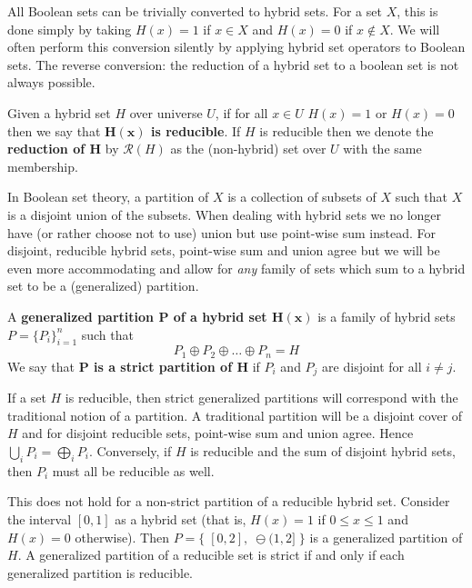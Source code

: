 All Boolean sets can be trivially converted to hybrid sets.
For a set $X$, this is done simply by taking $H(x)=1$ if $x \in X$ and $H(x)=0$ if $x \notin X$.
We will often perform this conversion silently by applying hybrid set operators to Boolean sets.
The reverse conversion: the reduction of a hybrid set to a boolean set is not always possible.


\begin{definition}
	Given a hybrid set $H$ over universe $U$, 
	if for all $x \in U$ $H(x)=1$ or $H(x)=0$ then we say that \textbf{$\boldsymbol{H(x)}$ is reducible}.
	If $H$ is reducible then we denote the \textbf{reduction of $\boldsymbol{H}$} by $\mathcal{R}(H)$ 
	as the (non-hybrid) set over $U$ with the same membership.  
\end{definition}


In Boolean set theory, a partition of $X$ is a collection of subsets of $X$ such that $X$ is a disjoint union of the subsets.
When dealing with hybrid sets we no longer have (or rather choose not to use) union but use point-wise sum instead.
For disjoint, reducible hybrid sets, point-wise sum and union agree but we will be even more accommodating 
and allow for \emph{any} family of sets which sum to a hybrid set to be a (generalized) partition.


\begin{definition}
	A \textbf{generalized partition $\boldsymbol{P}$ of a hybrid set $\boldsymbol{H(x)}$} is a family of hybrid sets
	$P=\{P_i \}_{i=1}^n$ such that
	\begin{equation}
		P_1 \oplus P_2 \oplus \ldots \oplus P_n = H
	\end{equation}
	We say that \textbf{$\boldsymbol{P}$ is a strict partition of $\boldsymbol{H}$} if 
	$P_i$ and $P_j$ are disjoint for all $i \neq j$.
\end{definition}


If a set $H$ is reducible, then strict generalized partitions will correspond with the traditional notion of a partition.
A traditional partition will be a disjoint cover of $H$ and for disjoint reducible sets, point-wise sum and union agree.
Hence $\bigcup_i P_i = \bigoplus_i P_i$. 
Conversely, if $H$ is reducible and the sum of disjoint hybrid sets, then $P_i$ must all be reducible as well.


This does not hold for a non-strict partition of a reducible hybrid set.
Consider the interval $[0,1]$ as a hybrid set (that is, $H(x)=1$ if $0 \leq x \leq 1$ and $H(x)=0$ otherwise).
Then $P = \big\{\; [0,2], \;\ominus (1,2] \; \big\}$ is a generalized partition of $H$. 
A generalized partition of a reducible set is strict if and only if each generalized partition is reducible.





